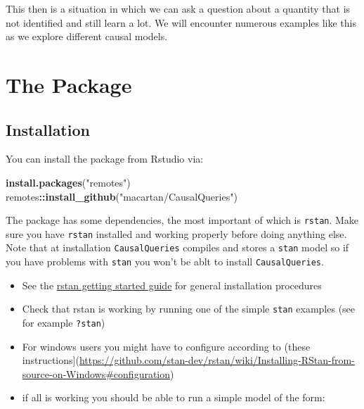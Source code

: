 \documentclass[
  12pt,
]{book}
\newenvironment{Shaded}{\begin{snugshade}}{\end{snugshade}}
\newcommand{\KeywordTok}[1]{\textcolor[rgb]{0.13,0.29,0.53}{\textbf{#1}}}
\newcommand{\NormalTok}[1]{#1}
\newcommand{\OperatorTok}[1]{\textcolor[rgb]{0.81,0.36,0.00}{\textbf{#1}}}
\newcommand{\StringTok}[1]{\textcolor[rgb]{0.31,0.60,0.02}{#1}}
\providecommand{\tightlist}{%
  \setlength{\itemsep}{0pt}\setlength{\parskip}{0pt}}
\begin{document}
This then is a situation in which we can ask a question about a quantity that is not identified and still learn a lot. We will encounter numerous examples like this as we explore different causal models.

\hypertarget{part-the-package}{%
\part{The Package}\label{part-the-package}}

\hypertarget{package}{%
\chapter{Installation}\label{package}}

You can install the package from Rstudio via:

\begin{Shaded}
\begin{Highlighting}[]
\KeywordTok{install.packages}\NormalTok{(}\StringTok{"remotes"}\NormalTok{)}
\NormalTok{remotes}\OperatorTok{::}\KeywordTok{install_github}\NormalTok{(}\StringTok{"macartan/CausalQueries"}\NormalTok{)}
\end{Highlighting}
\end{Shaded}

The package has some dependencies, the most important of which is \texttt{rstan}. Make sure you have \texttt{rstan} installed and working properly before doing anything else. Note that at installation \texttt{CausalQueries} compiles and stores a \texttt{stan} model so if you have problems with \texttt{stan} you won't be ablt to install \texttt{CausalQueries}.

\begin{itemize}
\tightlist
\item
  See the \href{https://github.com/stan-dev/rstan/wiki/RStan-Getting-Started}{rstan getting started guide} for general installation procedures
\item
  Check that rstan is working by running one of the simple \texttt{stan} examples (see for example \texttt{?stan})
\item
  For windows users you might have to configure according to (these instructions{]}(\url{https://github.com/stan-dev/rstan/wiki/Installing-RStan-from-source-on-Windows\#configuration})
\item
  if all is working you should be able to run a simple model of the form:
\end{itemize}
\end{document}
